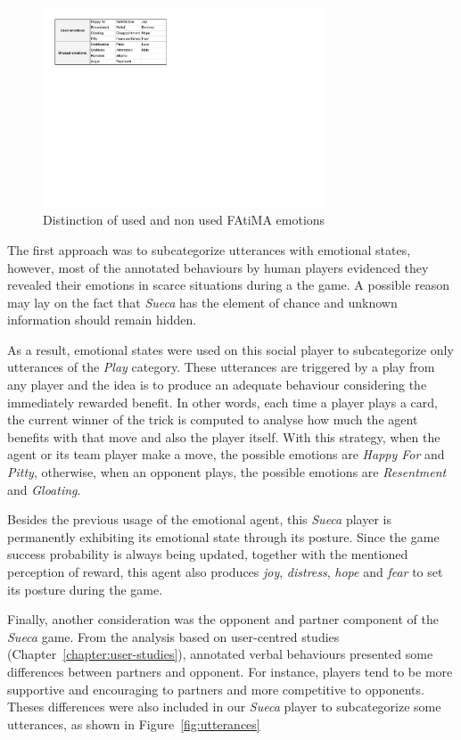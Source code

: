 \begin{figure}[ht]
	\centering
    \includegraphics[width=0.75\textwidth]{./img/6/emotions}
	\caption{Distinction of used and non used FAtiMA emotions}
\label{fig:emotions}
\end{figure}

The first approach was to subcategorize utterances with emotional states, however, most of the annotated behaviours by human players evidenced they revealed their emotions in scarce situations during a the game.
A possible reason may lay on the fact that \emph{Sueca} has the element of chance and unknown information should remain hidden.

As a result, emotional states were used on this social player to subcategorize only utterances of the \emph{Play} category.
These utterances are triggered by a play from any player and the idea is to produce an adequate behaviour considering the immediately rewarded benefit.
In other words, each time a player plays a card, the current winner of the trick is computed to analyse how much the agent benefits with that move and also the player itself.
With this strategy, when the agent or its team player make a move, the possible emotions are \emph{Happy For} and \emph{Pitty}, otherwise, when an opponent plays, the possible emotions are \emph{Resentment} and \emph{Gloating}.

Besides the previous usage of the emotional agent, this \emph{Sueca} player is permanently exhibiting its emotional state through its posture.
Since the game success probability is always being updated, together with the mentioned perception of reward, this agent also produces \emph{joy}, \emph{distress}, \emph{hope} and \emph{fear} to set its posture during the game.

Finally, another consideration was the opponent and partner component of the \emph{Sueca} game.
From the analysis based on user-centred studies (Chapter~\ref{chapter:user-studies}), annotated verbal behaviours presented some differences between partners and opponent.
For instance, players tend to be more supportive and encouraging to partners and more competitive to opponents.
Theses differences were also included in our \emph{Sueca} player to subcategorize some utterances, as shown in Figure~\ref{fig:utterances}


